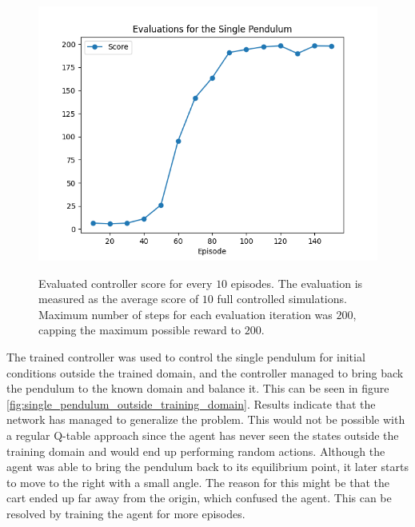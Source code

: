 \documentclass{LTHtwocol} %
\begin{document}
\begin{figure}[H]
	\centering
	\includegraphics[width=0.9\columnwidth]{figures/SinglePendulum_eval.png}
	\label{fig:single_pendulum_eval}
	\caption{Evaluated controller score for every $10$ episodes. The evaluation is measured as the average score of $10$ full controlled simulations. Maximum number of steps for each evaluation iteration was $200$, capping the maximum possible reward to $200$.}
\end{figure}

%

The trained controller was used to control the single pendulum for initial conditions outside the trained domain, and the controller managed to bring back the pendulum to the known domain and balance it.
This can be seen in figure \ref{fig:single_pendulum_outside_training_domain}.
Results indicate that the network has managed to generalize the problem.
This would not be possible with a regular Q-table approach since the agent has never seen the states outside the training domain and would end up performing random actions.
Although the agent was able to bring the pendulum back to its equilibrium point, it later starts to move to the right with a small angle.
The reason for this might be that the cart ended up far away from the origin, which confused the agent.
This can be resolved by training the agent for more episodes.
\end{document}

